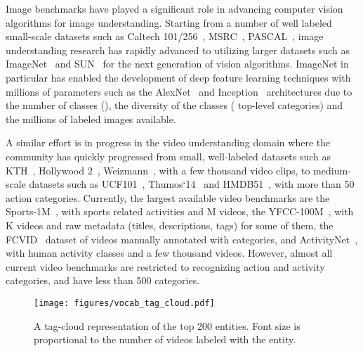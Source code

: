 \documentclass{sig-alternate-05-2015}
\begin{document}
Image benchmarks have played a significant role in advancing computer vision
algorithms for image understanding. Starting from a number of well labeled
small-scale datasets such as
Caltech 101/256\hfill~\cite{caltech-101,caltech-256},
MSRC~\cite{msrc}, PASCAL~\cite{pascal}, image understanding research has rapidly
advanced to utilizing larger datasets such as ImageNet~\cite{ImageNet} and
SUN~\cite{sun} for the next generation of vision algorithms. ImageNet in
particular has enabled the development of deep feature learning techniques with
millions of parameters such as the AlexNet\hfill~\cite{krizhevsky2012imagenet} and
Inception~\cite{inception-bn} architectures due to the number of classes (),
the diversity of the classes ( top-level categories) and the millions of
labeled images available.


A similar effort is in progress in the video understanding domain where the community has quickly progressed from small, well-labeled datasets such as
 KTH~\cite{kth}, Hollywood 2~\cite{hollywood}, Weizmann~\cite{weizmann}, with a few thousand video clips, to medium-scale datasets such as UCF101~\cite{ucf101},
 Thumos`14~\cite{thumos} and HMDB51~\cite{hmdb}, with more than 50 action categories. Currently, the largest available video benchmarks are the
 Sports-1M~\cite{karpathy2014large}, with  sports related activities and M videos, the YFCC-100M~\cite{yfcc}, with K videos and
 raw metadata (titles, descriptions, tags) for some of them, the FCVID~\cite{fcvid} dataset of  videos manually annotated with  categories, and
 ActivityNet~\cite{actnet}, with  human activity classes and a few thousand videos. However,
almost all current video benchmarks are restricted to recognizing action and activity categories, and have less than 500 categories.

\begin{figure*}[t]
\begin{center}
  \texttt{[image: figures/vocab\_tag\_cloud.pdf]}
\end{center}
\caption{A tag-cloud representation of the top 200 entities. Font size is
  proportional to the number of videos labeled with the entity.}
\label{fig:tag-cloud}
\end{figure*}
\end{document}
